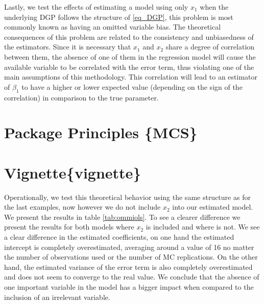 \documentclass[10pt,a4paper]{article}
\begin{document}
 Lastly, we test the effects of estimating a model using only \(x_1\)
 when the underlying DGP follows the structure of \eqref{eq_DGP}, this
 problem is most commonly known as having an omitted variable bias. The
 theoretical consequences of this problem are related to the consistency
 and unbiasedness of the estimators. Since it is necessary that \(x_1\)
 and \(x_2\) share a degree of correlation between them, the absence of
 one of them in the regression model will cause the available variable
 to be correlated with the error term, thus violating one of the main
 assumptions of this methodology. This correlation will lead to an
 estimator of \(\beta_1\) to have a higher or lower expected value
 (depending on the sign of the correlation) in comparison to the true
 parameter.

 \hypertarget{package-principles-mcs}{%
 \section{Package Principles \{MCS\}}\label{package-principles-mcs}}

 \hypertarget{vignettevignette}{%
 \section{Vignette\{vignette\}}\label{vignettevignette}}

 Operationally, we test this theoretical behavior using the same
 structure as for the last examples, now however we do not include
 \(x_2\) into our estimated model. We present the results in table
 \ref{tab:ommiols}. To see a clearer difference we present the results
 for both models where \(x_2\) is included and where is not. We see a
 clear difference in the estimated coefficients, on one hand the
 estimated intercept is completely overestimated, averaging around a
 value of 16 no matter the number of observations used or the number of
 MC replications. On the other hand, the estimated variance of the error
 term is also completely overestimated and does not seem to converge to
 the real value. We conclude that the absence of one important variable
 in the model has a bigger impact when compared to the inclusion of an
 irrelevant variable.
\end{document}
